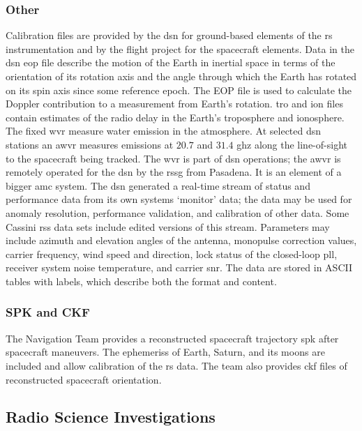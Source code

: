 \documentclass{article}
\theoremstyle{mystyle}
\begin{document}
\subsubsection{\footnotesize Other}
Calibration files are provided by the \gls{dsn} for ground-based elements of the \gls{rs} instrumentation and by the flight project for the spacecraft elements. Data in the \gls{dsn} \gls{eop} file describe the motion of the Earth in inertial space in terms of the orientation of its rotation axis and the angle through which the Earth has rotated on its spin axis since some reference epoch. The EOP file is used to calculate the Doppler contribution to a measurement from Earth's rotation. \gls{tro} and \gls{ion} files contain estimates of the radio delay in the Earth's troposphere and ionosphere. The fixed \gls{wvr} measure water emission in the atmosphere. At selected \gls{dsn} stations an \gls{awvr} measures emissions
at $20.7$ and $31.4$ \gls{ghz} along the line-of-sight to the spacecraft being tracked. The \gls{wvr} is part of \gls{dsn} operations; the \gls{awvr} is remotely operated for the \gls{dsn} by the \gls{rssg} from Pasadena. It is an element of a bigger \gls{amc} system. The \gls{dsn} generated a real-time stream of status and performance data from its own
systems ‘monitor’ data; the data may be used for anomaly resolution, performance
validation, and calibration of other data. Some Cassini \gls{rss} data sets include edited versions of this stream. Parameters may include \gls{azimuth} and \gls{elevation} angles of the antenna, \gls{monopulse} correction values, \gls{carrier} \gls{frequency}, wind speed and direction, lock status of the \gls{closed-loop} \gls{pll}, receiver system noise temperature, and \gls{carrier} \gls{snr}. The data are stored in ASCII tables with labels, which describe both the format and content. 

\subsubsection{\footnotesize SPK and CKF}

The Navigation Team provides a reconstructed spacecraft trajectory \gls{spk} after spacecraft maneuvers. The \glspl{ephemeris} of Earth, Saturn, and its moons are included and allow  calibration of the \gls{rs} data. The team also provides \gls{ckf} files of reconstructed spacecraft orientation. 
%
\subsection{Radio Science Investigations}
%
\end{document}
